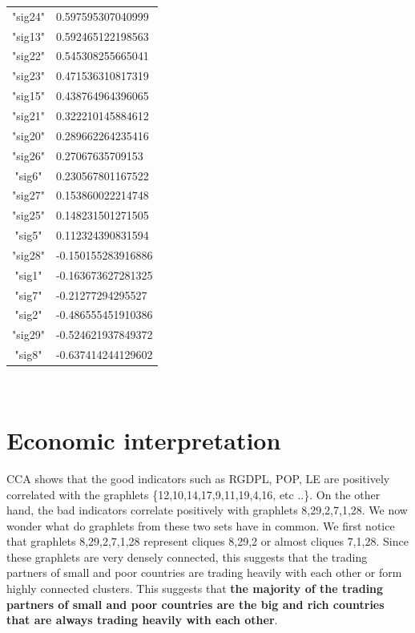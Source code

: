 \documentclass[11pt,a4paper,oneside]{report}
\begin{document}
\begin{tabular}{ c | l }
\cellcolor{col4}"sig24"& 0.597595307040999\\
\cellcolor{col2}"sig13"& 0.592465122198563\\
\cellcolor{col4}"sig22"& 0.545308255665041\\
\cellcolor{col4}"sig23"& 0.471536310817319\\
\cellcolor{col2}"sig15"& 0.438764964396065\\
\cellcolor{col3}"sig21"& 0.322210145884612\\
\cellcolor{col3}"sig20"& 0.289662264235416\\
\cellcolor{col5}"sig26"& 0.27067635709153\\
\cellcolor{col3}"sig6" &0.230567801167522\\
\cellcolor{col5}"sig27"& 0.153860022214748\\
\cellcolor{col4}"sig25"& 0.148231501271505\\
\cellcolor{col3}"sig5"& 0.112324390831594\\
\cellcolor{col6}"sig28"& -0.150155283916886\\
\cellcolor{col5}"sig1"& -0.163673627281325\\
\cellcolor{col6}"sig7"& -0.21277294295527\\
\cellcolor{col7}"sig2"& -0.486555451910386\\
\cellcolor{col7}"sig29"& -0.524621937849372\\
\cellcolor{col7}"sig8"& -0.637414244129602\\
\end{tabular}\\

\section*{Economic interpretation}

CCA shows that the good indicators such as RGDPL, POP, LE are positively correlated with the graphlets \{12,10,14,17,9,11,19,4,16, etc ..\}. On the other hand, the bad indicators correlate positively with graphlets {8,29,2,7,1,28}.
We now wonder what do graphlets from these two sets have in common. We first notice that graphlets {8,29,2,7,1,28} represent cliques {8,29,2} or almost cliques {7,1,28}. Since these graphlets are very densely connected, this suggests that the trading partners of small and poor countries are trading heavily with each other or form highly connected clusters. This suggests that \textbf{the majority of the trading partners of small and poor countries are the big and rich countries that are always trading heavily with each other}. 
\end{document}
